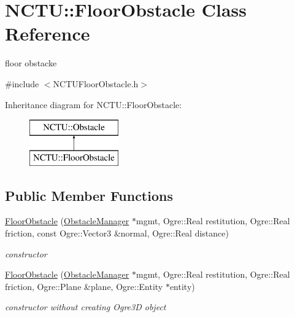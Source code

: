 \hypertarget{class_n_c_t_u_1_1_floor_obstacle}{}\section{N\+C\+TU\+:\+:Floor\+Obstacle Class Reference}
\label{class_n_c_t_u_1_1_floor_obstacle}


floor obstacke  




{\ttfamily \#include $<$N\+C\+T\+U\+Floor\+Obstacle.\+h$>$}

Inheritance diagram for N\+C\+TU\+:\+:Floor\+Obstacle\+:\begin{figure}[H]
\begin{center}
\leavevmode
\includegraphics[height=2.000000cm]{class_n_c_t_u_1_1_floor_obstacle}
\end{center}
\end{figure}
\subsection*{Public Member Functions}
\begin{DoxyCompactItemize}
\item 
\hyperlink{class_n_c_t_u_1_1_floor_obstacle_a294bf5268a78caaa328672bfd645150b}{Floor\+Obstacle} (\hyperlink{class_n_c_t_u_1_1_obstacle_manager}{Obstacle\+Manager} $\ast$mgmt, Ogre\+::\+Real restitution, Ogre\+::\+Real friction, const Ogre\+::\+Vector3 \&normal, Ogre\+::\+Real distance)\hypertarget{class_n_c_t_u_1_1_floor_obstacle_a294bf5268a78caaa328672bfd645150b}{}\label{class_n_c_t_u_1_1_floor_obstacle_a294bf5268a78caaa328672bfd645150b}

\begin{DoxyCompactList}\small\item\em constructor \end{DoxyCompactList}\item 
\hyperlink{class_n_c_t_u_1_1_floor_obstacle_abeac4b4c5816079be57518efe2a931e7}{Floor\+Obstacle} (\hyperlink{class_n_c_t_u_1_1_obstacle_manager}{Obstacle\+Manager} $\ast$mgmt, Ogre\+::\+Real restitution, Ogre\+::\+Real friction, Ogre\+::\+Plane \&plane, Ogre\+::\+Entity $\ast$entity)\hypertarget{class_n_c_t_u_1_1_floor_obstacle_abeac4b4c5816079be57518efe2a931e7}{}\label{class_n_c_t_u_1_1_floor_obstacle_abeac4b4c5816079be57518efe2a931e7}

\begin{DoxyCompactList}\small\item\em constructor without creating Ogre3D object \end{DoxyCompactList}\end{DoxyCompactItemize}
